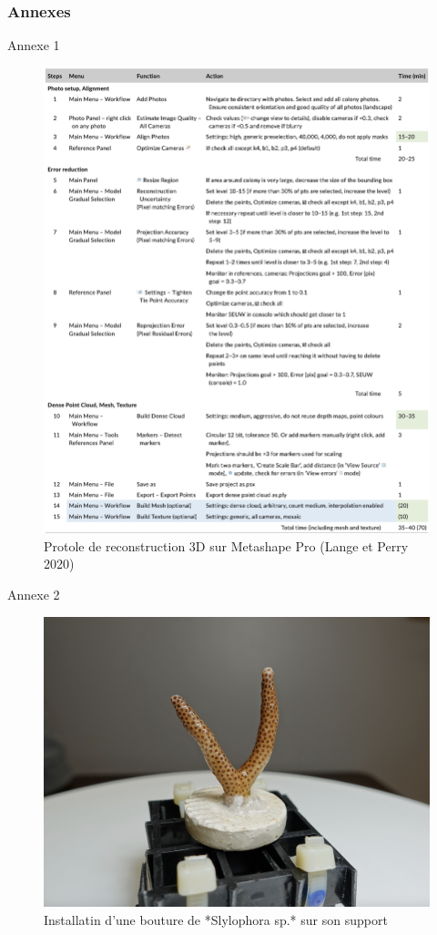 \documentclass[]{article}
\begin{document}
\hypertarget{annexes}{%
\subsubsection{Annexes}\label{annexes}}

Annexe 1

\begin{figure}

{\centering \includegraphics[width=0.6\linewidth]{images/protocol} 

}

\caption{Protole de reconstruction 3D sur Metashape Pro (Lange et Perry 2020)}\label{fig:unnamed-chunk-4}
\end{figure}

Annexe 2

\begin{figure}

{\centering \includegraphics[width=0.6\linewidth]{images/bouture} 

}

\caption{Installatin d'une bouture de *Slylophora sp.* sur son support}\label{fig:unnamed-chunk-5}
\end{figure}
\end{document}
